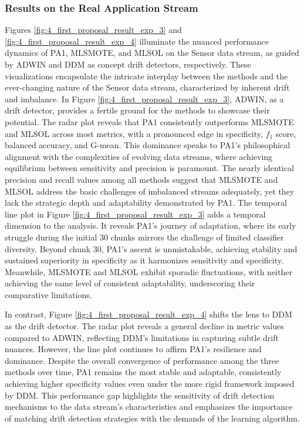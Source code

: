 \subsubsection{Results on the Real Application Stream}
Figures \ref{fig:4_first_proposal_result_exp_3} and \ref{fig:4_first_proposal_result_exp_4} illuminate the nuanced performance dynamics of PA1, MLSMOTE, and MLSOL on the Sensor data stream, as guided by ADWIN and DDM as concept drift detectors, respectively. These visualizations encapsulate the intricate interplay between the methods and the ever-changing nature of the Sensor data stream, characterized by inherent drift and imbalance. In Figure \ref{fig:4_first_proposal_result_exp_3}, ADWIN, as a drift detector, provides a fertile ground for the methods to showcase their potential. The radar plot reveals that PA1 consistently outperforms MLSMOTE and MLSOL across most metrics, with a pronounced edge in specificity, $f_1$ score, balanced accuracy, and G-mean. This dominance speaks to PA1’s philosophical alignment with the complexities of evolving data streams, where achieving equilibrium between sensitivity and precision is paramount. The nearly identical precision and recall values among all methods suggest that MLSMOTE and MLSOL address the basic challenges of imbalanced streams adequately, yet they lack the strategic depth and adaptability demonstrated by PA1. The temporal line plot in Figure \ref{fig:4_first_proposal_result_exp_3} adds a temporal dimension to the analysis. It reveals PA1’s journey of adaptation, where its early struggle during the initial 30 chunks mirrors the challenge of limited classifier diversity. Beyond chunk 30, PA1’s ascent is unmistakable, achieving stability and sustained superiority in specificity as it harmonizes sensitivity and specificity. Meanwhile, MLSMOTE and MLSOL exhibit sporadic fluctuations, with neither achieving the same level of consistent adaptability, underscoring their comparative limitations.

In contrast, Figure \ref{fig:4_first_proposal_result_exp_4} shifts the lens to DDM as the drift detector. The radar plot reveals a general decline in metric values compared to ADWIN, reflecting DDM’s limitations in capturing subtle drift nuances. However, the line plot continues to affirm PA1’s resilience and dominance. Despite the overall convergence of performance among the three methods over time, PA1 remains the most stable and adaptable, consistently achieving higher specificity values even under the more rigid framework imposed by DDM. This performance gap highlights the sensitivity of drift detection mechanisms to the data stream's characteristics and emphasizes the importance of matching drift detection strategies with the demands of the learning algorithm.

